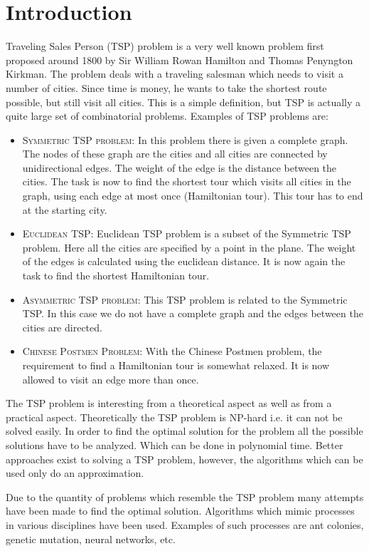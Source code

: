\section{Introduction}
 Traveling Sales Person (TSP) problem\cite{lcns1994} is a
very well known problem first proposed around 1800 by Sir William Rowan
Hamilton and Thomas Penyngton Kirkman. The problem deals with a traveling
salesman which needs to visit a number of cities. Since time is money, he
wants to take the shortest route possible, but still visit all cities. This is
a simple definition, but TSP is actually a quite large set of combinatorial
problems. Examples of TSP problems are:
\begin{itemize}
\item \textsc{Symmetric TSP problem:}  In this problem there is given a
complete graph.  The nodes of these graph are the cities and all cities are
connected by unidirectional edges. The weight of the edge is the distance
between the cities.  The task is now to find the shortest tour which visits
all cities in the graph, using each edge at most once (Hamiltonian tour). This
tour has to end at the starting city.
\item \textsc{Euclidean TSP:}  Euclidean TSP problem is a subset of the
Symmetric TSP problem.  Here all the cities are specified by a point in the
plane. The weight of the edges is calculated using the euclidean distance. It
is now again the task to find the shortest Hamiltonian tour.
\item \textsc{Asymmetric TSP problem:} This TSP problem is related to the
Symmetric TSP. In this case we do not have a complete graph and the edges
between the cities are directed.
\item \textsc{Chinese Postmen Problem:} With the Chinese Postmen problem,  the
requirement to find a Hamiltonian tour is somewhat relaxed. It is now allowed
to visit an edge more than once.
\end{itemize}

The TSP problem is interesting from a theoretical aspect as well as from a
practical aspect. Theoretically the TSP problem is NP-hard i.e. it can not be
solved easily. In order to find the optimal solution for the problem all the
possible solutions have to be analyzed. Which can be done in polynomial time.
Better approaches exist to solving a TSP problem, however, the algorithms
which can be used only do an approximation.

Due to the quantity of problems which resemble the TSP problem many attempts
have been made to find the optimal solution. Algorithms which mimic processes
in various disciplines have been used. Examples of such processes are ant
colonies, genetic mutation, neural networks, etc. 

